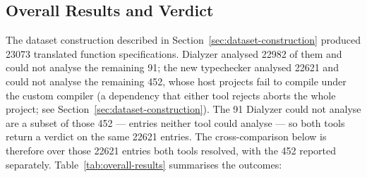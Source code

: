 \subsection{Overall Results and Verdict}
\label{sec:overall-results}

The dataset construction described in Section~\ref{sec:dataset-construction} produced \num{23073} translated function specifications.
Dialyzer analysed \num{22982} of them and could not analyse the remaining 91; the new typechecker analysed \num{22621} and could not analyse the remaining 452, whose host projects fail to compile under the custom compiler (a dependency that either tool rejects aborts the whole project; see Section~\ref{sec:dataset-construction}).
The 91 Dialyzer could not analyse are a subset of those 452 --- entries neither tool could analyse --- so both tools return a verdict on the same \num{22621} entries.
The cross-comparison below is therefore over those \num{22621} entries both tools resolved, with the 452 reported separately.
Table~\ref{tab:overall-results} summarises the outcomes:

